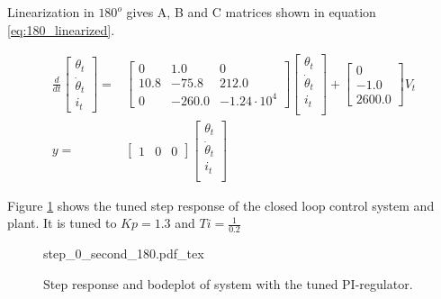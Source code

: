 \documentclass[../../../Main]{subfiles}
\begin{document}
Linearization in $180^o$ gives A, B and C matrices shown in equation \ref{eq:180_linearized}.

\begin{equation}
      \label{eq:180_linearized}
      \begin{split}
      \frac{d}{dt}
    \begin{bmatrix}
        \theta_t \\
        \dot \theta_t \\
        i_t
    \end{bmatrix}
    =&
    \begin{bmatrix}0 & 1.0 & 0\\ 10.8 & -75.8 & 212.0\\ 0 & -260.0 & -1.24\cdot10^4 \end{bmatrix}
    \begin{bmatrix}
        \theta_t \\
        \dot \theta_t \\
        i_t \\
    \end{bmatrix}
    +
    \begin{bmatrix}
    0\\ -1.0\\ 2600.0
    \end{bmatrix}
    V_t
\\
      y =&
    \begin{bmatrix}
        1 & 0 & 0
    \end{bmatrix}
    \begin{bmatrix}
        \theta_t \\
        \dot \theta_t\\
        i_t\\
    \end{bmatrix}
    \end{split}
\end{equation}


Figure \ref{fig:step_0_second_180} shows the tuned step response of the closed loop control system and plant.
It is tuned to $Kp = 1.3$ and $Ti = \frac{1}{0.2}$
\begin{figure}[H]
\centering
\def\svgwidth{\textwidth}
{step_0_second_180.pdf_tex}
\caption{Step response and bodeplot of system with the tuned PI-regulator.}
\label{fig:step_0_second_180}
\end{figure}
\end{document}
